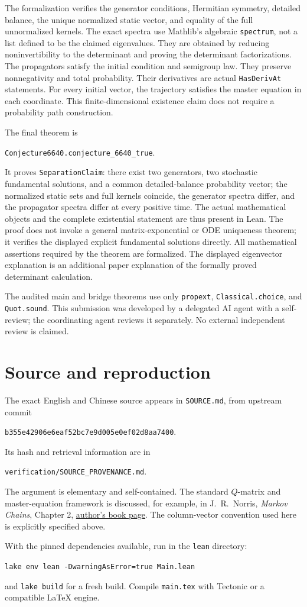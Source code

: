 \documentclass[11pt]{article}
\begin{document}
The formalization verifies the generator conditions, Hermitian
symmetry, detailed balance, the unique normalized static vector, and
equality of the full unnormalized kernels. The exact spectra use
Mathlib's algebraic \texttt{spectrum}, not a list defined to be the
claimed eigenvalues. They are obtained by reducing noninvertibility
to the determinant and proving the determinant factorizations.
The propagators satisfy the initial condition and semigroup law.
They preserve nonnegativity and total probability. Their derivatives
are actual \texttt{HasDerivAt} statements. For every initial vector,
the trajectory satisfies the master equation in each coordinate.
This finite-dimensional existence claim does not require a probability
path construction.

The final theorem is
\begin{center}\texttt{Conjecture6640.conjecture\_6640\_true}.\end{center}
It proves \texttt{SeparationClaim}: there exist two generators, two
stochastic fundamental solutions, and a common detailed-balance
probability vector; the normalized static sets and full kernels
coincide, the generator spectra differ, and the propagator spectra
differ at every positive time. The actual mathematical objects and
the complete existential statement are thus present in Lean.
The proof does not invoke a general matrix-exponential or ODE
uniqueness theorem; it verifies the displayed explicit fundamental
solutions directly. All mathematical assertions required by the
theorem are formalized. The displayed eigenvector explanation is
an additional paper explanation of the formally proved determinant
calculation.

The audited main and bridge theorems use only \texttt{propext},
\texttt{Classical.choice}, and \texttt{Quot.sound}. This submission
was developed by a delegated AI agent with a self-review; the
coordinating agent reviews it separately. No external independent
review is claimed.

\section*{Source and reproduction}
The exact English and Chinese source appears in \texttt{SOURCE.md},
from upstream commit
\begin{center}\texttt{b355e42906e6eaf52bc7e9d005e0ef02d8aa7400}.\end{center}
Its hash and retrieval information are in
\begin{center}\texttt{verification/SOURCE\_PROVENANCE.md}.\end{center}
The argument is elementary and self-contained. The standard
$Q$-matrix and master-equation framework is discussed, for example,
in J.~R.~Norris, \emph{Markov Chains}, Chapter 2,
\href{https://www.statslab.cam.ac.uk/~jrn10/Markov/}{author's book page}.
The column-vector convention used here is explicitly specified above.

With the pinned dependencies available, run in the \texttt{lean}
directory:
\begin{center}\texttt{lake env lean -DwarningAsError=true Main.lean}\end{center}
and \texttt{lake build} for a fresh build. Compile \texttt{main.tex}
with Tectonic or a compatible LaTeX engine.
\end{document}
